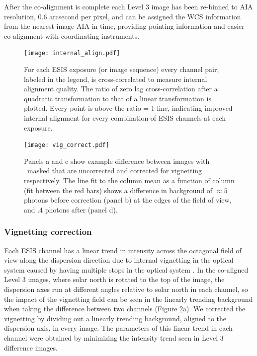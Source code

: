 After the co-alignment is complete each Level 3 image has been re-binned to AIA resolution, 0.6 arcsecond per pixel, and can be assigned the WCS information \citep{WCS} from the nearest image AIA in time, providing pointing information and easier co-alignment with coordinating instruments.



 \begin{figure}[htb!]
	\centering
	\texttt{[image: internal\_align.pdf]}
	\caption{For each ESIS exposure (or image sequence) every channel pair, labeled in the legend, is cross-correlated to measure internal alignment quality.  The ratio of zero lag cross-correlation after a quadratic transformation to that of a linear transformation is plotted.  Every point is above the ratio = 1 line, indicating improved internal alignment for every combination of ESIS channels at each exposure.}
	\label{fig:cc}	
\end{figure}

 \begin{figure}[htb!]
	\centering
	\texttt{[image: vig\_correct.pdf]}
	\caption{Panels a and c show example difference between images with \mgxbright \ masked that are uncorrected and corrected for vignetting respectively.  The line fit to the column mean as a function of column (fit between the red bars) shows a difference in background of $\approx 5$ photons before correction (panel b) at the edges of the field of view, and .4 photons after (panel d). }
	\label{fig:vig_correct}
\end{figure}

\subsubsection{Vignetting correction}
  
Each ESIS channel has a linear trend in intensity across the octagonal field of view along the dispersion direction due to internal vignetting in the optical system caused by having multiple stops in the optical system \citep{ESIS}.
In the co-aligned Level 3 images, where solar north is rotated to the top of the image, the dispersion axes run at different angles relative to solar north in each channel, so the impact of the vignetting field can be seen in the linearly trending background when taking the difference between two channels (Figure \ref{fig:vig_correct}a).
We corrected the vignetting by dividing out a linearly trending background, aligned to the dispersion axis, in every image. The parameters of this linear trend in each channel were obtained by minimizing the intensity trend seen in Level 3 difference images.

